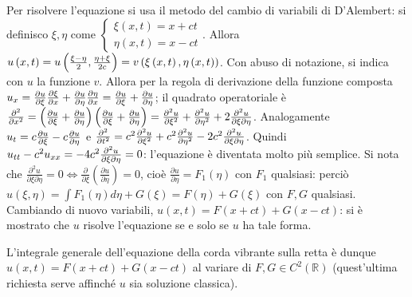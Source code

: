 \documentclass{article}
\begin{document}
Per risolvere l'equazione si usa il metodo del cambio di variabili di
D'Alembert: si definisco $\xi ,\eta $ come $\left\{ 
\begin{array}{c}
\xi \left( x,t\right) =x+ct \\ 
\eta \left( x,t\right) =x-ct%
\end{array}%
\right. $. Allora $u\left( x,t\right) =u\left( \frac{\xi -\eta }{2},\frac{%
\eta +\xi }{2c}\right) =v\left( \xi \left( x,t\right) ,\eta \left(
x,t\right) \right) $. Con abuso di notazione, si indica con $u$ la funzione $%
v$. Allora per la regola di derivazione della funzione composta $u_{x}=\frac{%
\partial u}{\partial \xi }\frac{\partial \xi }{\partial x}+\frac{\partial u}{%
\partial \eta }\frac{\partial \eta }{\partial x}=\frac{\partial u}{\partial
\xi }+\frac{\partial u}{\partial \eta }$; il quadrato operatoriale \`{e} $%
\frac{\partial ^{2}}{\partial x^{2}}=\left( \frac{\partial u}{\partial \xi }+%
\frac{\partial u}{\partial \eta }\right) \left( \frac{\partial u}{\partial
\xi }+\frac{\partial u}{\partial \eta }\right) =\frac{\partial ^{2}u}{%
\partial \xi ^{2}}+\frac{\partial ^{2}u}{\partial \eta ^{2}}+2\frac{\partial
^{2}u}{\partial \xi \partial \eta }$. Analogamente $u_{t}=c\frac{\partial u}{%
\partial \xi }-c\frac{\partial u}{\partial \eta }$ e $\frac{\partial ^{2}}{%
\partial t^{2}}=c^{2}\frac{\partial ^{2}u}{\partial \xi ^{2}}+c^{2}\frac{%
\partial ^{2}u}{\partial \eta ^{2}}-2c^{2}\frac{\partial ^{2}u}{\partial \xi
\partial \eta }$. Quindi $u_{tt}-c^{2}u_{xx}=-4c^{2}\frac{\partial ^{2}u}{%
\partial \xi \partial \eta }=0$: l'equazione \`{e} diventata molto pi\`{u}
semplice. Si nota che $\frac{\partial ^{2}u}{\partial \xi \partial \eta }%
=0\Longleftrightarrow \frac{\partial }{\partial \xi }\left( \frac{\partial u%
}{\partial \eta }\right) =0$, cio\`{e} $\frac{\partial u}{\partial \eta }%
=F_{1}\left( \eta \right) $ con $F_{1}$ qualsiasi: perci\`{o} $u\left( \xi
,\eta \right) =\int F_{1}\left( \eta \right) d\eta +G\left( \xi \right)
=F\left( \eta \right) +G\left( \xi \right) $ con $F,G$ qualsiasi. Cambiando
di nuovo variabili, $u\left( x,t\right) =F\left( x+ct\right) +G\left(
x-ct\right) $: si \`{e} mostrato che $u$ risolve l'equazione se e solo se $u$
ha tale forma.

L'integrale generale dell'equazione della corda vibrante sulla retta \`{e}
dunque $u\left( x,t\right) =F\left( x+ct\right) +G\left( x-ct\right) $ al
variare di $F,G\in C^{2}\left( 
\mathbb{R}
\right) $ (quest'ultima richiesta serve affinch\'{e} $u$ sia soluzione
classica).
\end{document}
